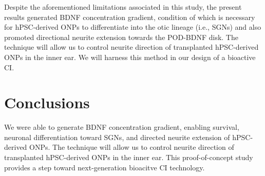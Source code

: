 \documentclass[review]{elsarticle}
\begin{document}
\indent Despite the aforementioned limitations associated in this study, the present results generated BDNF concentration gradient, condition of which is necessary for hPSC-derived ONPs to differentiate into the otic lineage (i.e., SGNs) and also promoted directional neurite extension towards the POD-BDNF disk. The technique will allow us to control neurite direction of transplanted hPSC-derived ONPs in the inner ear. We will harness this method in our design of a bioactive CI. 


\section* {Conclusions}
We were able to generate BDNF concentration gradient, enabling survival, neuronal differentiation toward SGNs, and directed neurite extension of hPSC-derived ONPs. The technique will allow us to control neurite direction of transplanted hPSC-derived ONPs in the inner ear. This proof-of-concept study provides a step toward next-generation bioacitve CI technology. 
\end{document}

